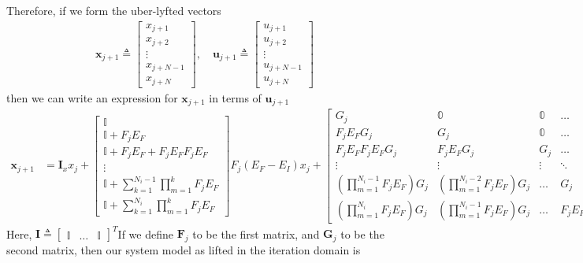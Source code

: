 \documentclass[landscape]{article}
\begin{document}
Therefore, if we form the uber-lyfted vectors
\begin{align}
\mathbf{x}_{j+1} \triangleq \begin{bmatrix} x_{j+1} \\ x_{j+2} \\ \vdots \\ x_{j+N-1} \\ x_{j+N}\end{bmatrix}, \quad 
\mathbf{u}_{j+1} \triangleq \begin{bmatrix} u_{j+1} \\ u_{j+2} \\ \vdots \\ u_{j+N-1} \\ u_{j+N}\end{bmatrix}
\end{align}
then we can write an expression for $\mathbf{x}_{j+1}$ in terms of $\mathbf{u}_{j+1}$
\begin{align}
\mathbf{x}_{j+1} 
& = \mathbf{I}_x x_j + \begin{bmatrix} \mathbb{I} \\ \mathbb{I} + F_j E_F \\ \mathbb{I} + F_j E_F + F_j E_F F_j E_F\\ \vdots \\ \mathbb{I} + \sum_{k = 1}^{N_i-1} \prod_{m=1}^{k}F_j E_F \\ \mathbb{I} + \sum_{k = 1}^{N_i} \prod_{m=1}^{k}F_j E_F \end{bmatrix} F_j \left(E_F - E_I\right)x_j
+\begin{bmatrix} 
G_j & \mathbb{0} & \mathbb{0} & \hdots & \mathbb{0} \\
F_j E_F G_j   & G_j & \mathbb{0} & \hdots & \mathbb{0} \\
F_j E_F F_j E_F G_j   & F_j E_F G_j & G_j & \hdots & \mathbb{0} \\
\vdots & \vdots & \vdots & \ddots & \vdots \\
\left(\prod_{m=1}^{N_i-1}F_j E_F\right)G_j & \left(\prod_{m=1}^{N_i-2}F_j E_F\right)G_j & \hdots & G_j & \mathbb{0} \\
\left(\prod_{m=1}^{N_i}F_j E_F\right)G_j & \left(\prod_{m=1}^{N_i-1}F_j E_F\right)G_j & \hdots & F_j E_F G_j & G_j
\end{bmatrix}
\left(\mathbf{u}_{j+1}- \mathbf{I}_u u_j \right)
\end{align}
Here, $\mathbf{I}\triangleq \begin{bmatrix} \mathbb{I} & \hdots & \mathbb{I} \end{bmatrix}^T$If we define $\mathbf{F}_j$ to be the first matrix, and $\mathbf{G}_j$ to be the second matrix, then our system model as lifted in the iteration domain is
\end{document}
